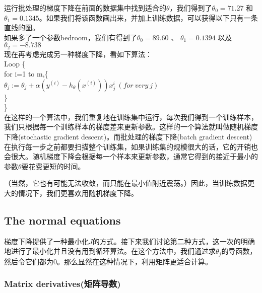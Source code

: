 \documentclass[UTF8]{ctexart}
\begin{document}
 运行批处理的梯度下降在前面的数据集中找到适合的$\theta$，我们得到了$\theta_{0} = 71.27$ 和 $\theta_{1} = 0.1345$。如果我们将该函数画出来，并加上训练数据，可以获得以下只有一条直线的图。\\

 如果多了一个参数bedroom，我们有得到了$\theta_{0} =89.60$ 、 $\theta_{1} = 0.1394$ 以及 $\theta_{2} = -8.738$\\

 现在再考虑完成另一种梯度下降，看如下算法：\\

 Loop \{\\

 for i=1 to m,\{\\

 	$  \theta_{j}:= \theta_{j} + \alpha  (y^{(i)}-h_{\theta}(x^{(i)})) x_{j}^{i} \ (for\ very\ j) $\\

 	\}\\

 \}\\


 在这样的一个算法中，我们重复地在训练集中运行，每次我们得到一个训练样本，我们只根据每一个训练样本的梯度差来更新参数。这样的一个算法就叫做随机梯度下降(stochastic gradient descent)。而批处理的梯度下降(batch gradient descent)在执行每一步之前都要扫描整个训练集，如果训练集的规模很大的话，它的开销也会很大。随机梯度下降会根据每一个样本来更新参数，通常它得到的接近于最小的参数$\theta$要花费更短的时间。

（当然，它也有可能无法收敛，而只能在最小值附近震荡。）因此，当训练数据更大的情况下，我们更喜欢用随机梯度下降。
\begin{figure}[htb]        
\end{figure}



\subsection{The normal equations}

梯度下降提供了一种最小化$J$的方式。接下来我们讨论第二种方式，这一次的明确地进行了最小化并且没有用到循环算法。在这个方法中，我们通过求$\theta_{j}$的导函数，然后令它们都为0。那么显然在这种情况下，利用矩阵更适合计算。

\subsubsection{Matrix derivatives(矩阵导数)}
\end{document}
